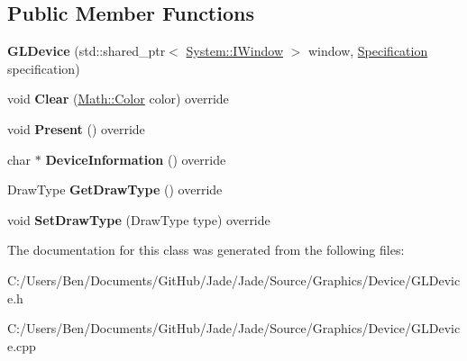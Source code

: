 \subsection*{Public Member Functions}
\begin{DoxyCompactItemize}
\item 
\hypertarget{class_jade_1_1_graphics_1_1_g_l_device_af62110c6a84a1ef415f1ae17a2a78424}{}{\bfseries G\+L\+Device} (std\+::shared\+\_\+ptr$<$ \hyperlink{struct_jade_1_1_system_1_1_i_window}{System\+::\+I\+Window} $>$ window, \hyperlink{struct_jade_1_1_graphics_1_1_specification}{Specification} specification)\label{class_jade_1_1_graphics_1_1_g_l_device_af62110c6a84a1ef415f1ae17a2a78424}

\item 
\hypertarget{class_jade_1_1_graphics_1_1_g_l_device_a3787d704d6525c4bee4ed0596a83f739}{}void {\bfseries Clear} (\hyperlink{struct_jade_1_1_math_1_1_color}{Math\+::\+Color} color) override\label{class_jade_1_1_graphics_1_1_g_l_device_a3787d704d6525c4bee4ed0596a83f739}

\item 
\hypertarget{class_jade_1_1_graphics_1_1_g_l_device_a427a46a9d12fac4d130cf8dc656fb13d}{}void {\bfseries Present} () override\label{class_jade_1_1_graphics_1_1_g_l_device_a427a46a9d12fac4d130cf8dc656fb13d}

\item 
\hypertarget{class_jade_1_1_graphics_1_1_g_l_device_a17c8e8a20dc5689bc231fc3ead268be1}{}char $\ast$ {\bfseries Device\+Information} () override\label{class_jade_1_1_graphics_1_1_g_l_device_a17c8e8a20dc5689bc231fc3ead268be1}

\item 
\hypertarget{class_jade_1_1_graphics_1_1_g_l_device_a28c812dd961799a31cb5ce6a8941c95f}{}Draw\+Type {\bfseries Get\+Draw\+Type} () override\label{class_jade_1_1_graphics_1_1_g_l_device_a28c812dd961799a31cb5ce6a8941c95f}

\item 
\hypertarget{class_jade_1_1_graphics_1_1_g_l_device_a5239dfd2e005e7a3ad976925c98ba9d2}{}void {\bfseries Set\+Draw\+Type} (Draw\+Type type) override\label{class_jade_1_1_graphics_1_1_g_l_device_a5239dfd2e005e7a3ad976925c98ba9d2}

\end{DoxyCompactItemize}


The documentation for this class was generated from the following files\+:\begin{DoxyCompactItemize}
\item 
C\+:/\+Users/\+Ben/\+Documents/\+Git\+Hub/\+Jade/\+Jade/\+Source/\+Graphics/\+Device/G\+L\+Device.\+h\item 
C\+:/\+Users/\+Ben/\+Documents/\+Git\+Hub/\+Jade/\+Jade/\+Source/\+Graphics/\+Device/G\+L\+Device.\+cpp\end{DoxyCompactItemize}
